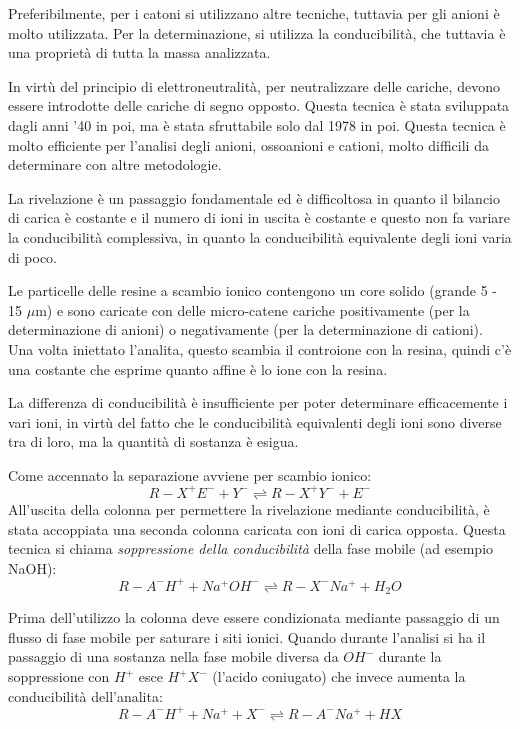 Preferibilmente, per i catoni si utilizzano altre tecniche, tuttavia per gli anioni è molto utilizzata. Per la determinazione, si utilizza la conducibilità, che tuttavia è una proprietà di tutta la massa analizzata.


In virtù del principio di elettroneutralità, per neutralizzare delle cariche, devono essere introdotte delle cariche di segno opposto. Questa tecnica è stata sviluppata dagli anni '40 in poi, ma è stata sfruttabile solo dal 1978 in poi. Questa tecnica è molto efficiente per l'analisi degli anioni, ossoanioni e cationi, molto difficili da determinare con altre metodologie.


La rivelazione è un passaggio fondamentale ed è difficoltosa in quanto il bilancio di carica è costante e il numero di ioni in uscita è costante e questo non fa variare la conducibilità complessiva, in quanto la conducibilità equivalente degli ioni varia di poco.

Le particelle delle resine a scambio ionico contengono un core solido (grande 5 - 15  $\mu$m) e sono caricate con delle micro-catene cariche positivamente (per la determinazione di anioni) o negativamente (per la determinazione di cationi). Una volta iniettato l'analita, questo scambia il controione con la resina, quindi c'è una costante che esprime quanto affine è lo ione con la resina.

La differenza di conducibilità è insufficiente per poter determinare efficacemente i vari ioni, in virtù del fatto che le conducibilità equivalenti degli ioni sono diverse tra di loro, ma la quantità di sostanza è esigua.

Come accennato la separazione avviene per scambio ionico:
\[
R-X^+E^- + Y^- \rightleftharpoons R-X^+Y^- + E^- 
\]
All'uscita della colonna per permettere la rivelazione mediante conducibilità, è stata accoppiata una seconda colonna caricata con ioni di carica opposta. Questa tecnica si chiama \emph{soppressione della conducibilità} della fase mobile (ad esempio NaOH):
\[
R-A^-H^+ + Na^+OH^- \rightleftharpoons R-X^-Na^+ + H_2O
\]


Prima dell'utilizzo la colonna deve essere condizionata mediante passaggio di un flusso di fase mobile per saturare i siti ionici. Quando durante l'analisi si ha il passaggio di una sostanza nella fase mobile diversa da $OH^-$ durante la soppressione con $H^+$ esce $H^+X^-$ (l'acido coniugato) che invece aumenta la conducibilità dell'analita:
\[
R-A^-H^+ + Na^+ + X^- \rightleftharpoons R-A^-Na^+ + HX
\]

